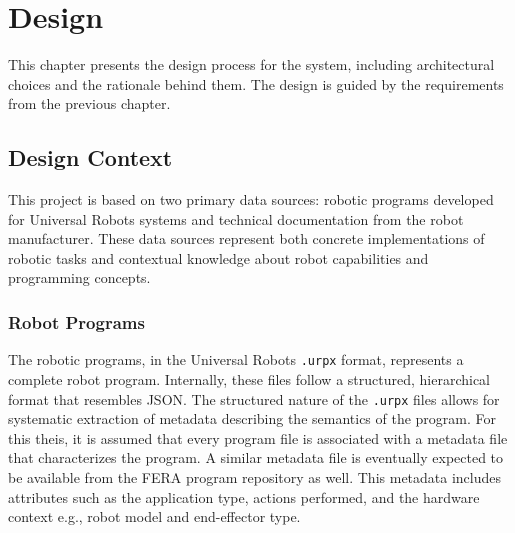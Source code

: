 \chapter{Design} \label{chapter:design}
This chapter presents the design process for the system, including architectural choices and the rationale behind them. The design is guided by the requirements from the previous chapter.


\section{Design Context}
This project is based on two primary data sources: robotic programs developed for Universal Robots systems and technical documentation from the robot manufacturer. These data sources represent both concrete implementations of robotic tasks and contextual knowledge about robot capabilities and programming concepts.

\subsection{Robot Programs}
The robotic programs, in the Universal Robots \texttt{.urpx} format, represents a complete robot program. Internally, these files follow a structured, hierarchical format that resembles JSON. The structured nature of the \texttt{.urpx} files allows for systematic extraction of metadata describing the semantics of the program. For this theis, it is assumed that every program file is associated with a metadata file that characterizes the program. A similar metadata file is eventually expected to be available from the FERA program repository as well. This metadata includes attributes such as the application type, actions performed, and the hardware context e.g., robot model and end-effector type.

